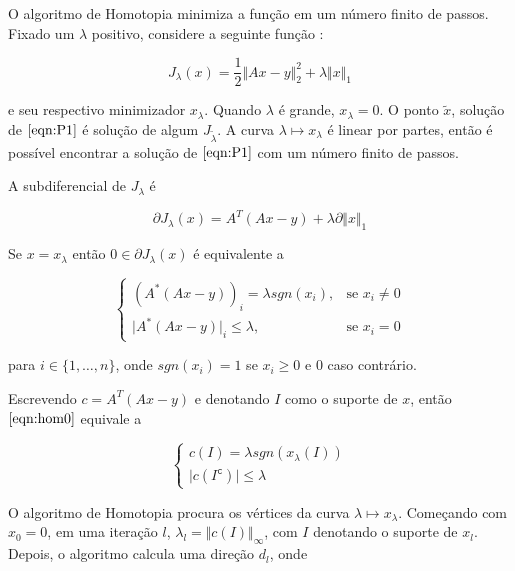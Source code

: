 
O algoritmo de Homotopia \cite{fornasier} \cite{dontsa} minimiza a função em um número finito de passos. Fixado um $\lambda$ positivo, considere a seguinte função :

$$J_{\lambda} (x) = \frac{1}{2} \Vert Ax - y \Vert_2^2 + \lambda \Vert x \Vert_1$$

e seu respectivo minimizador $x_\lambda$. Quando $\lambda$ é grande, $x_{\lambda} = 0$. O ponto $\tilde{x}$, solução de $\eqref{eqn:P1}$ é solução de algum $J_{\tilde{\lambda}}$. A curva $\lambda \longmapsto x_{\lambda}$ é linear por partes, então é possível encontrar a solução de $\eqref{eqn:P1}$ com um número finito de passos.

A subdiferencial de $J_\lambda$ é

$$\partial J_\lambda(x) = A^{T}(Ax - y) + \lambda \partial \Vert x \Vert_1$$

Se $x = x_\lambda$ então $0 \in \partial J_\lambda(x)$ é equivalente a

\begin{equation}
\begin{cases}
(A^*(Ax - y))_i           =    \lambda sgn(x_i), &\mbox{se } x_i \neq 0\\
\vert A^*(Ax - y)\vert_i  \leq \lambda,          &\mbox{se } x_i = 0
\end{cases}
\label{eqn:hom0}
\end{equation}

para $i \in \{1, \hdots, n \}$, onde $sgn(x_i) = 1$ se $x_i \geq 0$ e $0$ caso contrário.

Escrevendo $c = A^{T}(Ax - y)$ e denotando $I$ como o suporte de $x$, então $\eqref{eqn:hom0}$ equivale a

\begin{equation}
\begin{cases}
c(I)           =    \lambda sgn(x_{\lambda}(I)) \\
\vert c(I^{\texttt{c}}) \vert \leq \lambda
\end{cases}
\label{eqn:hom1}
\end{equation}

O algoritmo de Homotopia procura os vértices da curva $\lambda \longmapsto x_\lambda$. Começando com $x_0 = 0$, em uma iteração $l$, $\lambda_l = \Vert c(I) \Vert_{\infty}$, com $I$ denotando o suporte de $x_l$. Depois, o algoritmo calcula uma direção $d_l$, onde

